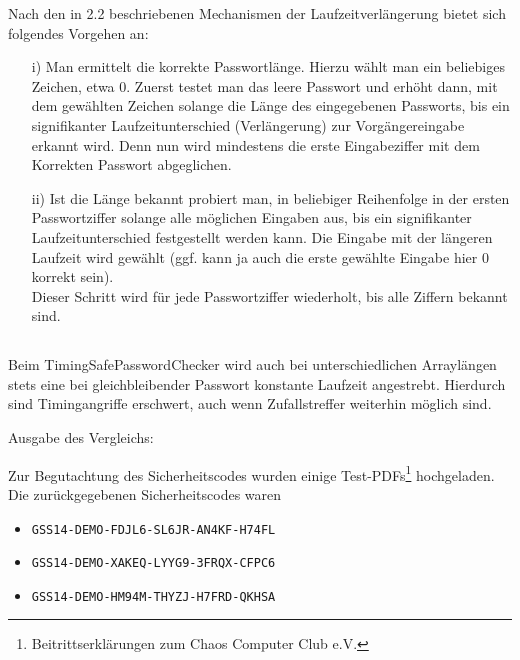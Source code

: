 \documentclass[ngerman]{fbi-aufgabenblatt}
\begin{document}
	Nach den in 2.2 beschriebenen Mechanismen der Laufzeitverlängerung bietet sich folgendes Vorgehen an:

	\begin{itemize}
		\item[i)] Man ermittelt die korrekte Passwortlänge. Hierzu wählt man ein beliebiges Zeichen, etwa $0$. Zuerst testet man das leere Passwort und erhöht dann, mit dem gewählten Zeichen solange die Länge des eingegebenen Passworts, bis ein signifikanter Laufzeitunterschied (Verlängerung) zur Vorgängereingabe erkannt wird. Denn nun wird mindestens die erste Eingabeziffer mit dem Korrekten Passwort abgeglichen.
		
		\item[ii)] Ist die Länge bekannt probiert man, in beliebiger Reihenfolge in der ersten Passwortziffer solange alle möglichen Eingaben aus, bis ein signifikanter Laufzeitunterschied festgestellt werden kann. Die Eingabe mit der längeren Laufzeit wird gewählt (ggf. kann ja auch die erste gewählte Eingabe hier $0$ korrekt sein).\\
Dieser Schritt wird für jede Passwortziffer wiederholt, bis alle Ziffern bekannt sind.
	\end{itemize}

	\newpage

	\subsection{}

	Beim TimingSafePasswordChecker wird auch bei unterschiedlichen Arraylängen stets eine bei gleichbleibender Passwort konstante Laufzeit angestrebt. Hierdurch sind Timingangriffe erschwert, auch wenn Zufallstreffer weiterhin möglich sind.

	Ausgabe des Vergleichs:

	


	Zur Begutachtung des Sicherheitscodes wurden einige Test-PDFs\footnote{Beitrittserklärungen zum Chaos Computer Club e.V.} hochgeladen. Die zurückgegebenen Sicherheitscodes waren

	\begin{itemize}
		\item{\texttt{GSS14-DEMO-FDJL6-SL6JR-AN4KF-H74FL}}
		\item{\texttt{GSS14-DEMO-XAKEQ-LYYG9-3FRQX-CFPC6}}
		\item{\texttt{GSS14-DEMO-HM94M-THYZJ-H7FRD-QKHSA}}
		\end{itemize}
\end{document}

